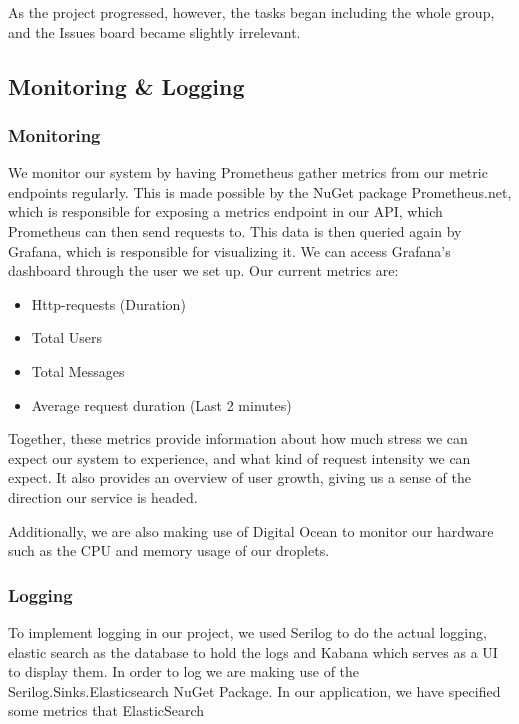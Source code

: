 \noindent As the project progressed, however, the tasks began including the whole group, and the Issues board became slightly irrelevant.

\subsection{Monitoring \& Logging}

\subsubsection{Monitoring} \label{Monitoring}

We monitor our system by having Prometheus gather metrics from our metric endpoints regularly. This is made possible by the NuGet package Prometheus.net, which is responsible for exposing a metrics endpoint in our API, which Prometheus can then send requests to. This data is then queried again by Grafana, which is responsible for visualizing it. We can access Grafana's dashboard through the user we set up. Our current metrics are:

\begin{itemize}
    \item Http-requests (Duration)
    \item Total Users
    \item Total Messages
    \item Average request duration (Last 2 minutes)
\end{itemize}

\noindent Together, these metrics provide information about how much stress we can expect our system to experience, and what kind of request intensity we can expect. It also provides an overview of user growth, giving us a sense of the direction our service is headed. 

Additionally, we are also making use of Digital Ocean to monitor our hardware such as the CPU and memory usage of our droplets.

\subsubsection{Logging} \label{Logging}

To implement logging in our project, we used Serilog to do the actual logging, elastic search as the database to hold the logs and Kabana which serves as a UI to display them.
In order to log we are making use of the Serilog.Sinks.Elasticsearch NuGet Package. In our application, we have specified some metrics that ElasticSearch 

